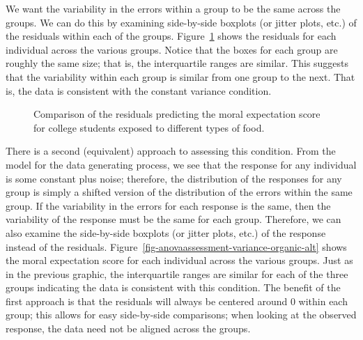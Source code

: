 \documentclass[
  letterpaper,
  DIV=11,
  numbers=noendperiod]{scrreprt}
\theoremstyle{plain}
\theoremstyle{definition}
\theoremstyle{definition}
\theoremstyle{remark}
\begin{document}
We want the variability in the errors within a group to be the same
across the groups. We can do this by examining side-by-side boxplots (or
jitter plots, etc.) of the residuals within each of the groups.
Figure~\ref{fig-anovaassessment-variance-organic} shows the residuals
for each individual across the various groups. Notice that the boxes for
each group are roughly the same size; that is, the interquartile ranges
are similar. This suggests that the variability within each group is
similar from one group to the next. That is, the data is consistent with
the constant variance condition.

\begin{figure}


\caption{\label{fig-anovaassessment-variance-organic}Comparison of the
residuals predicting the moral expectation score for college students
exposed to different types of food.}

\end{figure}%

There is a second (equivalent) approach to assessing this condition.
From the model for the data generating process, we see that the response
for any individual is some constant plus noise; therefore, the
distribution of the responses for any group is simply a shifted version
of the distribution of the errors within the same group. If the
variability in the errors for each response is the same, then the
variability of the response must be the same for each group. Therefore,
we can also examine the side-by-side boxplots (or jitter plots, etc.) of
the response instead of the residuals.
Figure~\ref{fig-anovaassessment-variance-organic-alt} shows the moral
expectation score for each individual across the various groups. Just as
in the previous graphic, the interquartile ranges are similar for each
of the three groups indicating the data is consistent with this
condition. The benefit of the first approach is that the residuals will
always be centered around 0 within each group; this allows for easy
side-by-side comparisons; when looking at the observed response, the
data need not be aligned across the groups.
\end{document}
